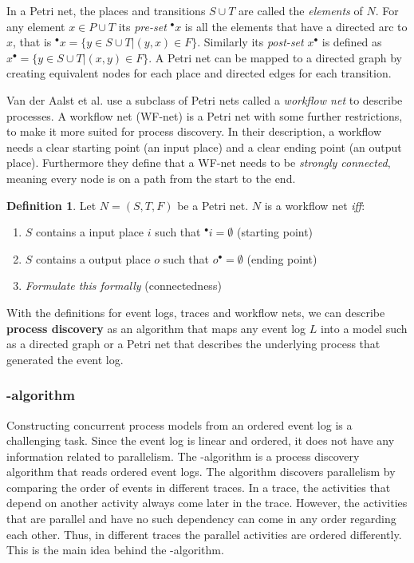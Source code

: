 \documentclass[english,12pt,a4paper,pdftex,sci,utf8]{aaltothesis}
\theoremstyle{definition}
\newtheorem{definition}{Definition}
\newcommand{\nyi}[1]{\noindent\colorbox{nyibg}{\textcolor{nyitext}{\emph{#1}}}}
\begin{document}
In a Petri net, the places and transitions $S \cup T$ are called the \emph{elements} of $N$.
For any element $x \in P \cup T$ its \emph{pre-set} ${}^\bullet x$ is all the elements that have a directed arc to $x$, that is ${}^\bullet x = \{y \in S \cup T | (y,x) \in F\}$. Similarly its \emph{post-set} $x^\bullet$ is defined as 
$x^\bullet = \{y \in S \cup T | (x,y) \in F\}$.
A Petri net can be mapped to a directed graph by creating equivalent nodes for each place and directed edges for each transition.

Van der Aalst et al. \cite{van2013discovering} use a subclass of Petri nets called a \emph{workflow net} to describe processes. A workflow net (WF-net) is a Petri net with some further restrictions, to make it more suited for process discovery. In their description, a workflow needs a clear starting point (an input place) and a clear ending point (an output place). Furthermore they define that a WF-net needs to be \emph{strongly connected}, meaning every node is on a path from the start to the end.

\begin{definition}
Let $N = (S, T, F)$ be a Petri net. $N$ is a workflow net \emph{iff}:
\begin{enumerate}
    \item $S$ contains a input place $i$ such that ${}^\bullet i = \emptyset$ (starting point)
    \item $S$ contains a output place $o$ such that $o^\bullet = \emptyset$ (ending point)
    \item \nyi{Formulate this formally} (connectedness)
\end{enumerate}
\end{definition}

With the definitions for event logs, traces and workflow nets, we can describe \textbf{process discovery} as an algorithm that maps any event log $L$ into a model such as a directed graph or a Petri net that describes the underlying process that generated the event log.

\subsubsection{\textalpha-algorithm}
\label{sec:alphaalgorithm}

Constructing concurrent process models from an ordered event log is a challenging task.
Since the event log is linear and ordered, it does not have any information related to parallelism.
The \textalpha-algorithm is a process discovery algorithm that reads ordered event logs.
The algorithm discovers parallelism by comparing the order of events in different traces.
In a trace, the activities that depend on another activity always come later in the trace.
However, the activities that are parallel and have no such dependency can come in any order regarding each other.
Thus, in different traces the parallel activities are ordered differently. 
This is the main idea behind the \textalpha-algorithm.
\end{document}
